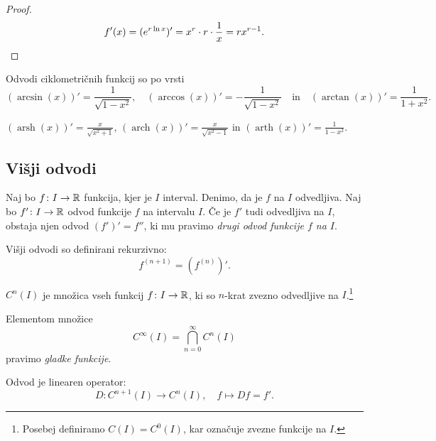 \documentclass[12pt, a4paper]{article}
\begin{document}
\begin{proof}
\[
f'(x)=(e^{r\ln x})'=x^r\cdot r\cdot\frac{1}{x}=rx^{r-1}.\qedhere
\]
\end{proof}

\begin{trditev}
Odvodi ciklometričnih funkcij so po vrsti
\[
(\arcsin(x))'=\frac{1}{\sqrt{1-x^2}},\quad (\arccos(x))'=-\frac{1}{\sqrt{1-x^2}}\quad\text{in}\quad (\arctan(x))'=\frac{1}{1+x^2}.
\]
\end{trditev}

\obvs

\begin{posledica}
$(\operatorname{arsh}(x))'=\frac{x}{\sqrt{x^2+1}}$, $(\operatorname{arch}(x))'=\frac{x}{\sqrt{x^2-1}}$ in $(\operatorname{arth}(x))'=\frac{1}{1-x^2}$.
\end{posledica}

\newpage

\subsection{Višji odvodi}

\begin{okvir}
\begin{definicija}
Naj bo $f\colon I\to\mathbb{R}$ funkcija, kjer je $I$ interval. Denimo, da je $f$ na $I$ odvedljiva. Naj bo $f'\colon I\to\mathbb{R}$ odvod funkcije $f$ na intervalu $I$. Če je $f'$ tudi odvedljiva na $I$, obstaja njen odvod $(f')'=f''$, ki mu pravimo \emph{drugi odvod funkcije $f$ na $I$}.

Višji odvodi so definirani rekurzivno:
\[
f^{(n+1)}=\left(f^{(n)}\right)'.
\]
\end{definicija}
\end{okvir}

\begin{definicija}
$C^n(I)$ je množica vseh funkcij $f\colon I\to\mathbb{R}$, ki so $n$-krat zvezno odvedljive na $I$.\footnote{Posebej definiramo $C(I)=C^0(I)$, kar označuje zvezne funkcije na $I$.}
\end{definicija}

\begin{definicija}
Elementom množice
\[
C^{\infty}(I)=\bigcap_{n=0}^{\infty}C^n(I)
\]
pravimo \emph{gladke funkcije}.
\end{definicija}

Odvod je linearen operator:
\[
D\colon C^{n+1}(I)\to C^n(I),\quad f\mapsto Df=f'.
\]

\newpage
\end{document}
